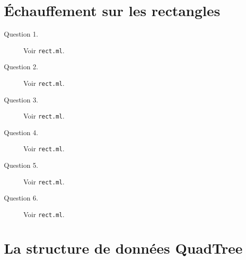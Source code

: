 \documentclass[11pt]{scrartcl}
\newcommand{\filename}[1]{\texttt{\textcolor{darkbrown}{#1}}}
\begin{document}
\section{Échauffement sur les rectangles}

\begin{description}
\item[Question 1.] Voir \filename{rect.ml}.

\item[Question 2.] Voir \filename{rect.ml}.

\item[Question 3.] Voir \filename{rect.ml}.

\item[Question 4.] Voir \filename{rect.ml}.

\item[Question 5.] Voir \filename{rect.ml}.

\item[Question 6.] Voir \filename{rect.ml}.
\end{description}

\section{La structure de données QuadTree}
\end{document}
